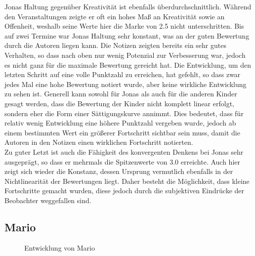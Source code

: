 Jonas Haltung gegenüber Kreativität ist ebenfalls überdurchschnittlich. Während den Veranstaltungen zeigte er oft ein hohes Maß an Kreativität sowie an Offenheit, weshalb seine Werte hier die Marke von 2.5 nicht unterschritten. Bis auf zwei Termine war Jonas Haltung sehr konstant, was an der guten Bewertung durch die Autoren liegen kann. Die Notizen zeigten bereits ein sehr gutes Verhalten, so dass nach oben nur wenig Potenzial zur Verbesserung war, jedoch es nicht ganz für die maximale Bewertung gereicht hat. Die Entwicklung, um den letzten Schritt auf eine volle Punktzahl zu erreichen, hat gefehlt, so dass zwar jedes Mal eine hohe Bewertung notiert wurde, aber keine wirkliche Entwicklung zu sehen ist. Generell kann sowohl für Jonas als auch für die anderen Kinder gesagt werden, dass die Bewertung der Kinder nicht komplett linear erfolgt, sondern eher die Form einer Sättigungskurve annimmt. Dies bedeutet, dass für relativ wenig Entwicklung eine höhere Punktzahl vergeben wurde, jedoch ab einem bestimmten Wert ein größerer Fortschritt sichtbar sein muss, damit die Autoren in den Notizen einen wirklichen Fortschritt notierten.\\
Zu guter Letzt ist auch die Fähigkeit des konvergenten Denkens bei Jonas sehr ausgeprägt, so dass er mehrmals die Spitzenwerte von 3.0 erreichte. Auch hier zeigt sich wieder die Konstanz, dessen Ursprung vermutlich ebenfalls in der Nichtlinearität der Bewertungen liegt. Daher besteht die Möglichkeit, dass kleine Fortschritte gemacht wurden, diese jedoch durch die subjektiven Eindrücke der Beobachter weggefallen sind.
    

\subsection*{Mario}
\begin{figure}[H]
	\centering
	\caption{Entwicklung von Mario}
	\label{img:marioDevelopment}
	
\end{figure}

